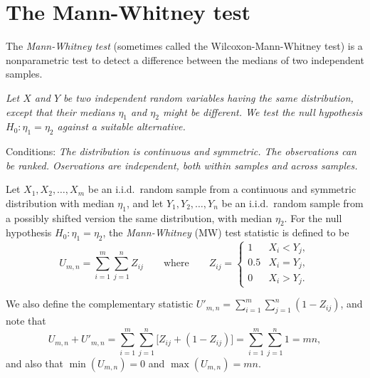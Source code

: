 \section{The Mann-Whitney test}
The \emph{Mann-Whitney test} (sometimes called the Wilcoxon-Mann-Whitney test) is a nonparametric test to detect a difference between the medians of two independent samples.

\bit
\it Let $X$ and $Y$ be two independent random variables having the same distribution, except that their medians $\eta_1$ and $\eta_2$ might be different. 
\it We test the null hypothesis $H_0:\eta_1 = \eta_2$ against a suitable alternative.
\eit

Conditions:
\bit
\it The distribution is continuous and symmetric.
\it The observations can be ranked.
\it Oservations are independent, both within samples and across samples.
\eit

%

\begin{definition}
Let $X_1,X_2,\ldots,X_m$ be an i.i.d.\ random sample from a continuous and symmetric distribution with median $\eta_1$, and let $Y_1,Y_2,\ldots,Y_n$ be an i.i.d.\ random sample from a possibly shifted version the same distribution, with median $\eta_2$. For the null hypothesis $H_0:\eta_1=\eta_2$, the \emph{Mann-Whitney} (MW) test statistic is defined to be
\[
U_{m,n} = \sum_{i=1}^m \sum_{j=1}^n Z_{ij} 
\qquad\text{where}\qquad 
Z_{ij} = \begin{cases} 
	1 	& X_i < Y_j, \\
	0.5	& X_i = Y_j, \\
	0	& X_i > Y_j.
\end{cases}
\]
\end{definition}

We also define the complementary statistic $U'_{m,n} = \displaystyle\sum_{i=1}^m \sum_{j=1}^n (1-Z_{ij})$, and note that
\[
U_{m,n} + U'_{m,n} = \sum_{i=1}^m\sum_{j=1}^n \big[Z_{ij} + (1-Z_{ij})\big] = \sum_{i=1}^m\sum_{j=1}^n 1 = mn,
\]
and also that $\min(U_{m,n})=0$ and $\max(U_{m,n})=mn$.

